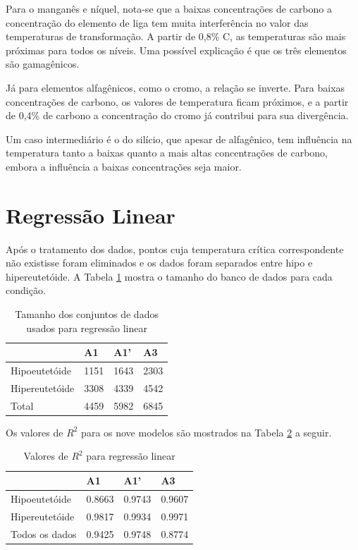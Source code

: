 \documentclass[brazil,tf,epusp]{usp}  %
\begin{document}
Para o manganês e níquel, nota-se que a baixas concentrações de carbono a concentração do elemento de liga tem muita interferência no valor das temperaturas de transformação. A partir de 0,8\% C, as temperaturas são mais próximas para todos os níveis. Uma possível explicação é que os três elementos são gamagênicos.

Já para elementos alfagênicos, como o cromo, a relação se inverte. Para baixas concentrações de carbono, os valores de temperatura ficam próximos, e a partir de 0,4\% de carbono a concentração do cromo já contribui para sua divergência.

Um caso intermediário é o do silício, que apesar de alfagênico, tem influência na temperatura tanto a baixas quanto a mais altas concentrações de carbono, embora a influência a baixas concentrações seja maior.


\section{Regressão Linear}

Após o tratamento dos dados, pontos cuja temperatura crítica correspondente não existisse foram eliminados e os
dados foram separados entre hipo e hipereutetóide. A Tabela \ref{tab:conj_dados} mostra o tamanho do banco de dados para cada condição.

\begin{table}
  \caption{Tamanho dos conjuntos de dados usados para regressão linear}

  \begin{tabular}{llll}
  \hline
                 & A1   & A1'  & A3   \\
  \hline
  Hipoeutetóide  & 1151 & 1643 & 2303 \\
  Hipereutetóide & 3308 & 4339 & 4542 \\
  Total          & 4459 & 5982 & 6845 \\
  \hline
  \end{tabular}

  \label{tab:conj_dados}
\end{table}

Os valores de $R^{2}$ para os nove modelos são mostrados na Tabela \ref{tab:r2_reg_lin} a seguir.

\begin{table}
  \caption{Valores de $R^{2}$ para regressão linear}

  \begin{tabular}{llll}
  \hline
  & A1     & A1'    & A3     \\
  \hline
  Hipoeutetóide  & 0.8663 & 0.9743 & 0.9607 \\
  Hipereutetóide & 0.9817 & 0.9934 & 0.9971 \\
  Todos os dados & 0.9425 & 0.9748 & 0.8774 \\
  \hline
  \end{tabular}

  \label{tab:r2_reg_lin}
\end{table}
\end{document}
